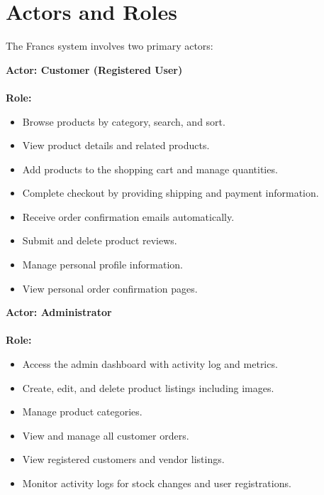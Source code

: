 \newpage
\section{Actors and Roles}

The Francs system involves two primary actors:

\noindent
\textbf{Actor: Customer (Registered User)}\\\\
\textbf{Role:}
\begin{itemize}
    \item Browse products by category, search, and sort.
    \item View product details and related products.
    \item Add products to the shopping cart and manage quantities.
    \item Complete checkout by providing shipping and payment information.
    \item Receive order confirmation emails automatically.
    \item Submit and delete product reviews.
    \item Manage personal profile information.
    \item View personal order confirmation pages.
\end{itemize}

\noindent
\textbf{Actor: Administrator}\\\\
\textbf{Role:}
\begin{itemize}
    \item Access the admin dashboard with activity log and metrics.
    \item Create, edit, and delete product listings including images.
    \item Manage product categories.
    \item View and manage all customer orders.
    \item View registered customers and vendor listings.
    \item Monitor activity logs for stock changes and user registrations.
\end{itemize}
